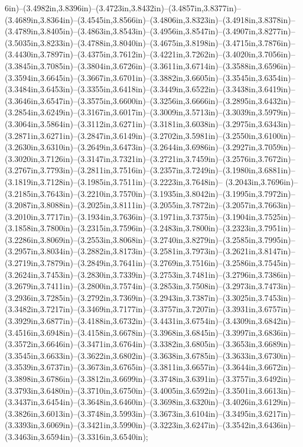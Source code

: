 6in)--(3.4982in,3.8396in)--(3.4723in,3.8432in)--(3.4857in,3.8377in)--(3.4689in,3.8364in)--(3.4545in,3.8566in)--(3.4806in,3.8323in)--(3.4918in,3.8378in)--(3.4789in,3.8405in)--(3.4863in,3.8543in)--(3.4956in,3.8547in)--(3.4907in,3.8277in)--(3.5035in,3.8233in)--(3.4788in,3.8040in)--(3.4675in,3.8198in)--(3.4715in,3.7876in)--(3.4430in,3.7897in)--(3.4375in,3.7612in)--(3.4221in,3.7262in)--(3.4020in,3.7056in)--(3.3845in,3.7085in)--(3.3804in,3.6726in)--(3.3611in,3.6714in)--(3.3588in,3.6596in)--(3.3594in,3.6645in)--(3.3667in,3.6701in)--(3.3882in,3.6605in)--(3.3545in,3.6354in)--(3.3484in,3.6453in)--(3.3355in,3.6418in)--(3.3449in,3.6522in)--(3.3438in,3.6419in)--(3.3646in,3.6547in)--(3.3575in,3.6600in)--(3.3256in,3.6666in)--(3.2895in,3.6432in)--(3.2854in,3.6249in)--(3.3167in,3.6017in)--(3.3009in,3.5713in)--(3.3039in,3.5979in)--(3.3064in,3.5864in)--(3.3112in,3.6271in)--(3.3181in,3.6038in)--(3.2975in,3.6343in)--(3.2871in,3.6271in)--(3.2847in,3.6149in)--(3.2702in,3.5981in)--(3.2550in,3.6100in)--(3.2630in,3.6310in)--(3.2649in,3.6473in)--(3.2644in,3.6986in)--(3.2927in,3.7059in)--(3.3020in,3.7126in)--(3.3147in,3.7321in)--(3.2721in,3.7459in)--(3.2576in,3.7672in)--(3.2767in,3.7793in)--(3.2811in,3.7516in)--(3.2357in,3.7249in)--(3.1980in,3.6881in)--(3.1819in,3.7128in)--(3.1985in,3.7511in)--(3.2223in,3.7648in)--
(3.2043in,3.7696in)--(3.2185in,3.7643in)--(3.2210in,3.7570in)--(3.1935in,3.8042in)--(3.1995in,3.7972in)--(3.2087in,3.8088in)--(3.2025in,3.8111in)--(3.2055in,3.7872in)--(3.2057in,3.7663in)--(3.2010in,3.7717in)--(3.1934in,3.7636in)--(3.1971in,3.7375in)--(3.1904in,3.7525in)--(3.1858in,3.7800in)--(3.2315in,3.7596in)--(3.2483in,3.7800in)--(3.2323in,3.7951in)--(3.2286in,3.8069in)--(3.2553in,3.8068in)--(3.2740in,3.8279in)--(3.2585in,3.7995in)--(3.2957in,3.8034in)--(3.2882in,3.8173in)--(3.2581in,3.7973in)--(3.2621in,3.8147in)--(3.2719in,3.7879in)--(3.2849in,3.7641in)--(3.2769in,3.7516in)--(3.2586in,3.7545in)--(3.2624in,3.7453in)--(3.2830in,3.7339in)--(3.2753in,3.7481in)--(3.2796in,3.7386in)--(3.2679in,3.7411in)--(3.2800in,3.7574in)--(3.2853in,3.7508in)--(3.2973in,3.7473in)--(3.2936in,3.7285in)--(3.2792in,3.7369in)--(3.2943in,3.7387in)--(3.3025in,3.7453in)--(3.3482in,3.7217in)--(3.3469in,3.7177in)--(3.3757in,3.7207in)--(3.3931in,3.6757in)--(3.3929in,3.6877in)--(3.4188in,3.6732in)--(3.4431in,3.6754in)--(3.4309in,3.6842in)--(3.4516in,3.6948in)--(3.4158in,3.6678in)--(3.3968in,3.6845in)--(3.3997in,3.6836in)--(3.3572in,3.6646in)--(3.3471in,3.6764in)--(3.3382in,3.6805in)--(3.3653in,3.6689in)--(3.3545in,3.6633in)--(3.3622in,3.6802in)--(3.3638in,3.6785in)--(3.3633in,3.6730in)--(3.3539in,3.6737in)--(3.3673in,3.6765in)--(3.3811in,3.6657in)--(3.3644in,3.6672in)--(3.3898in,3.6786in)--(3.3812in,3.6699in)--(3.3748in,3.6391in)--(3.3757in,3.6492in)--(3.3793in,3.6480in)--(3.3710in,3.6750in)--(3.4005in,3.6592in)--(3.3501in,3.6613in)--(3.3437in,3.6454in)--(3.3648in,3.6460in)--(3.3698in,3.6320in)--(3.4026in,3.6129in)--(3.3826in,3.6013in)--(3.3748in,3.5993in)--(3.3673in,3.6104in)--(3.3495in,3.6217in)--(3.3393in,3.6069in)--(3.3421in,3.5990in)--(3.3223in,3.6247in)--(3.3542in,3.6436in)--(3.3463in,3.6594in)--(3.3316in,3.6540in);
